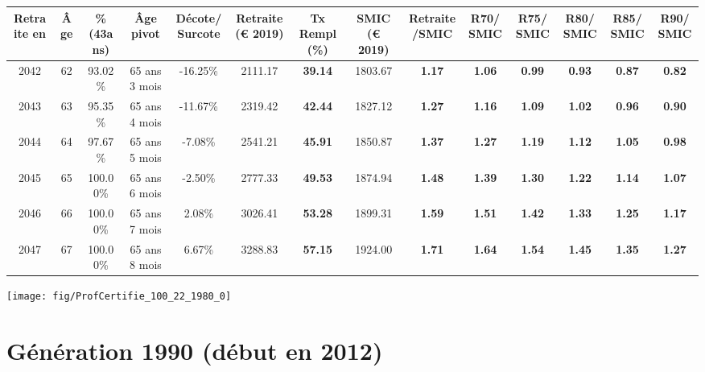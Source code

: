 \begin{adjustbox}{max width=\textwidth} 
\begin{tabular}[htb]{|c|c||c|c|c||c|c||c|c||c|c|c|c|c|} 
\hline 
 Retraite en &  Âge &  \%(43ans) &  Âge pivot &  Décote/Surcote &  Retraite (\euro{} 2019) &  Tx Rempl(\%) &  SMIC (\euro{} 2019) &  Retraite/SMIC &  R70/SMIC &  R75/SMIC &  R80/SMIC &  R85/SMIC &  R90/SMIC \\ 
\hline \hline 
 2042 &  62 &  93.02\% &  65 ans 3 mois &  -16.25\% &  2111.17 &  {\bf 39.14} &  1803.67 &  {\bf 1.17} &  {\bf 1.06} &  {\bf {\color{red} 0.99}} &  {\bf {\color{red} 0.93}} &  {\bf {\color{red} 0.87}} &  {\bf {\color{red} 0.82}} \\ 
\hline 
 2043 &  63 &  95.35\% &  65 ans 4 mois &  -11.67\% &  2319.42 &  {\bf 42.44} &  1827.12 &  {\bf 1.27} &  {\bf 1.16} &  {\bf 1.09} &  {\bf 1.02} &  {\bf {\color{red} 0.96}} &  {\bf {\color{red} 0.90}} \\ 
\hline 
 2044 &  64 &  97.67\% &  65 ans 5 mois &  -7.08\% &  2541.21 &  {\bf 45.91} &  1850.87 &  {\bf 1.37} &  {\bf 1.27} &  {\bf 1.19} &  {\bf 1.12} &  {\bf 1.05} &  {\bf {\color{red} 0.98}} \\ 
\hline 
 2045 &  65 &  100.00\% &  65 ans 6 mois &  -2.50\% &  2777.33 &  {\bf 49.53} &  1874.94 &  {\bf 1.48} &  {\bf 1.39} &  {\bf 1.30} &  {\bf 1.22} &  {\bf 1.14} &  {\bf 1.07} \\ 
\hline 
 2046 &  66 &  100.00\% &  65 ans 7 mois &  2.08\% &  3026.41 &  {\bf 53.28} &  1899.31 &  {\bf 1.59} &  {\bf 1.51} &  {\bf 1.42} &  {\bf 1.33} &  {\bf 1.25} &  {\bf 1.17} \\ 
\hline 
 2047 &  67 &  100.00\% &  65 ans 8 mois &  6.67\% &  3288.83 &  {\bf 57.15} &  1924.00 &  {\bf 1.71} &  {\bf 1.64} &  {\bf 1.54} &  {\bf 1.45} &  {\bf 1.35} &  {\bf 1.27} \\ 
\hline 
\hline 
\end{tabular} 
\end{adjustbox} 
 
 \vspace{0.1cm} 

 {\hspace{-2.2cm}\texttt{[image: fig/ProfCertifie\_100\_22\_1980\_0]}} 

\newpage 
 
\section{Génération 1990 (début en 2012)\label{ProfCertifie_100_22_1990_0}} 
 
